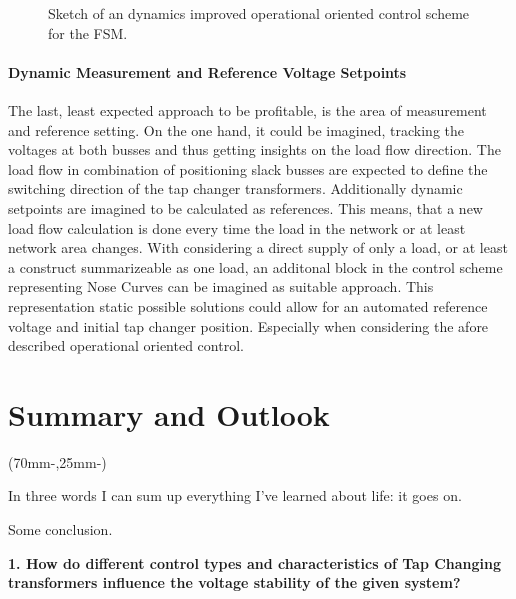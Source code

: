 \begin{figure}
        \centering
        \caption[Sketch of an dynamics improved operational oriented control scheme for the \acs{FSM}]{Sketch of an dynamics improved operational oriented control scheme for the \acs{FSM}.}
        \label{fig:sketch-control-improvement}
\end{figure}

\subsubsection{Dynamic Measurement and Reference Voltage Setpoints}

The last, least expected approach to be profitable, is the area of measurement and reference setting.
On the one hand, it could be imagined, tracking the voltages at both busses and thus getting insights on the load flow direction.
The load flow in combination of positioning slack busses are expected to define the switching direction of the tap changer transformers.
Additionally dynamic setpoints are imagined to be calculated as references.
This means, that a new load flow calculation is done every time the load in the network or at least network area changes.
With considering a direct supply of only a load, or at least a construct summarizeable as one load, an additonal block in the control scheme representing Nose Curves can be imagined as suitable approach.
This representation static possible solutions could allow for an automated reference voltage and initial tap changer position.
Especially when considering the afore described operational oriented control.

\chapter{Summary and Outlook}
\label{chap:summary}

\begin{textblock*}{.7\textwidth}(70mm-\offset,25mm-\offset)
    \begin{fquote}
        In three words I can sum up everything I've learned about life: it goes on.
    \end{fquote}
\end{textblock*}

Some conclusion.

\textbf{1. How do different control types and characteristics of Tap Changing transformers influence the voltage stability of the given system?}

